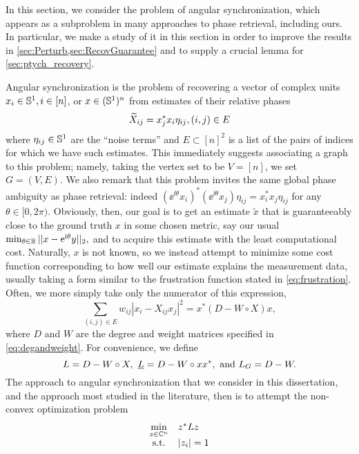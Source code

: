 In this section, we consider the problem of angular synchronization, which appears as a subproblem in many approaches to phase retrieval, including ours.  In particular, we make a study of it in this section in order to improve the results in \cref{sec:Perturb,sec:RecovGuarantee} and to supply a crucial lemma for \cref{sec:ptych_recovery}.

Angular synchronization is the problem of recovering a vector of complex units $x_i \in \mathbb{S}^1, i \in [n]$, or $x \in (\mathbb{S}^1)^n$ from estimates of their relative phases \[\widetilde{X}_{ij} = x_j^* x_i \eta_{ij}, (i, j) \in E\] where $\eta_{ij} \in \mathbb{S}^1$ are the ``noise terms'' and $E \subset [n]^2$ is a list of the pairs of indices for which we have such estimates.  This immediately suggests associating a graph to this problem; namely, taking the vertex set to be $V = [n]$, we set $G = (V, E)$.  We also remark that this problem invites the same global phase ambiguity as phase retrieval: indeed $(\ee^{\ii \theta} x_i)^* (\ee^{\ii \theta} x_j) \eta_{ij} = x_i^* x_j \eta_{ij}$ for any $\theta \in [0, 2\pi)$.  Obviously, then, our goal is to get an estimate $\tilde{x}$ that is guaranteeably close to the ground truth $x$ in some chosen metric, say our usual $\min_{\theta \in \mathbb{R}} || x - \mathrm{e}^{\mathrm{i} \theta} y ||_2,$ and to acquire this estimate with the least computational cost.  Naturally, $x$ is not known, so we instead attempt to minimize some cost function corresponding to how well our estimate explains the measurement data, usually taking a form similar to the frustration function stated in \eqref{eq:frustration}.  Often, we more simply take only the numerator of this expression, \[\sum_{(i, j) \in E} w_{ij} |x_i - X_{ij} x_j|^2 = x^* (D - W \circ X) x, \label{eq:ang_sync_cost}\] where $D$ and $W$ are the degree and weight matrices specified in \eqref{eq:degandweight}.  For convenience, we define \begin{equation} L = D - W \circ X, \ \underline{L} = D - W \circ x x^*, \ \text{and} \ L_G = D - W. \label{eq:L_defs} \end{equation}  The approach to angular synchronization that we consider in this dissertation, and the approach most studied in the literature, then is to attempt the non-convex optimization problem \begin{equation} \begin{array}{cl} \min\limits_{z \in \mathbb{C}^n} & z^* L z \\ \text{s.t.} & |z_i| = 1 \end{array} \label{eq:ang_sync}\end{equation}

